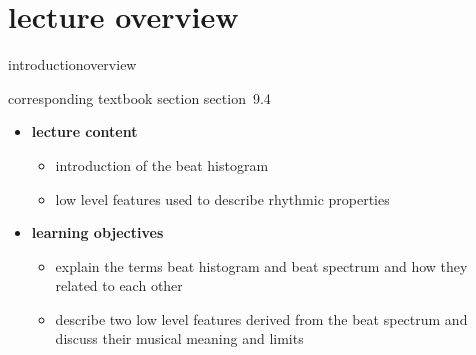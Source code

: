 


\subtitle{module 9.4: beat histogram}


	

    \section[overview]{lecture overview}
        \begin{frame}{introduction}{overview}
            \begin{block}{corresponding textbook section}
                    section~9.4
            \end{block}

            \begin{itemize}
                \item   \textbf{lecture content}
                    \begin{itemize}
                        \item   introduction of the beat histogram
                        \item   low level features used to describe rhythmic properties
                    \end{itemize}
                \bigskip
                \item<2->   \textbf{learning objectives}
                    \begin{itemize}
                        \item   explain the terms beat histogram and beat spectrum and how they related to each other
                        \item   describe two low level features derived from the beat spectrum and discuss their musical meaning and limits
                    \end{itemize}
            \end{itemize}
        \end{frame}

